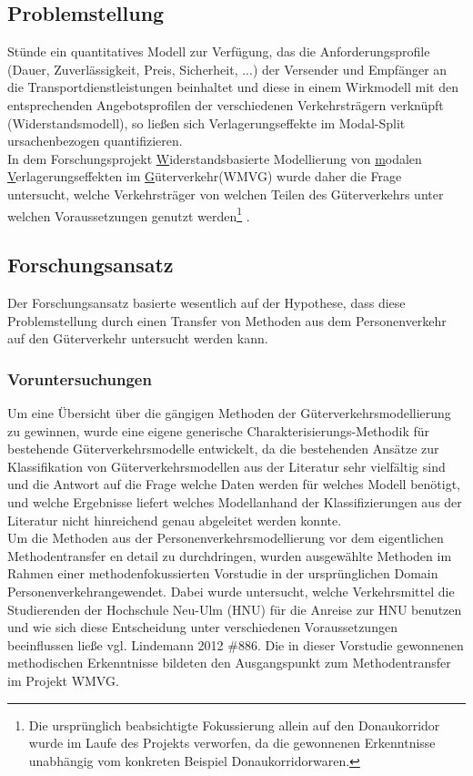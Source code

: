 \subsection{Problemstellung}
\label{_Toc364945116}
\label{_Toc365801587}
\label{_Toc366766071}
\label{_Toc366775265}
Stünde ein quantitatives Modell zur Verfügung, das die Anforderungsprofile (Dauer, Zuverlässigkeit, Preis, Sicherheit, ...) der Versender und Empfänger an die Transportdienstleistungen beinhaltet und diese in einem Wirkmodell mit den entsprechenden Angebotsprofilen der verschiedenen Verkehrsträgern verknüpft (Widerstandsmodell), so ließen sich Verlagerungseffekte im Modal-Split ursachenbezogen quantifizieren.~\\
In dem Forschungsprojekt \glqq \uline{W}iderstandsbasierte Modellierung von \uline{m}odalen \uline{V}erlagerungseffekten im \uline{G}üterverkehr\grqq  (WMVG) wurde daher die Frage untersucht, welche Verkehrsträger von welchen Teilen des Güterverkehrs unter welchen Voraussetzungen genutzt werden\footnote{%
 Die ursprünglich beabsichtigte Fokussierung allein auf den Donaukorridor wurde im Laufe des Projekts verworfen, da die gewonnenen Erkenntnisse unabhängig vom konkreten Beispiel \glqq Donaukorridor\grqq  waren.
}%
.  
% 
\subsection{Forschungsansatz}
\label{_Toc364945117}
\label{_Toc365801588}
\label{_Toc366766072}
\label{_Toc366775266}
Der Forschungsansatz basierte wesentlich auf der Hypothese, dass diese Problemstellung durch einen Transfer von Methoden aus dem Personenverkehr auf den Güterverkehr untersucht werden kann.~\\
% 
\subsubsection{Voruntersuchungen}
\label{_Toc366766073}
\label{_Toc366775267}
Um eine Übersicht über die gängigen Methoden der Güterverkehrsmodellierung zu gewinnen, wurde eine eigene generische Charakterisierungs-Methodik für bestehende Güterverkehrsmodelle entwickelt, da die bestehenden Ansätze zur Klassifikation von Güterverkehrsmodellen aus der Literatur sehr vielfältig sind und die Antwort auf die Frage \glqq welche Daten werden für welches Modell benötigt, und welche Ergebnisse liefert welches Modell\grqq  anhand der Klassifizierungen aus der Literatur nicht hinreichend genau abgeleitet werden konnte.~\\
Um die Methoden aus der Personenverkehrsmodellierung vor dem eigentlichen Methodentransfer en detail zu durchdringen, wurden ausgewählte Methoden im Rahmen einer methodenfokussierten Vorstudie in der ursprünglichen Domain \glqq Personenverkehr\grqq  angewendet. Dabei wurde untersucht, welche Verkehrsmittel die Studierenden der Hochschule Neu-Ulm (HNU) für die Anreise zur HNU benutzen und wie sich diese Entscheidung unter verschiedenen Voraussetzungen beeinflussen ließe {vgl.  Lindemann 2012 \#886}. Die in dieser Vorstudie gewonnenen methodischen Erkenntnisse bildeten den Ausgangspunkt zum Methodentransfer im Projekt WMVG. 
